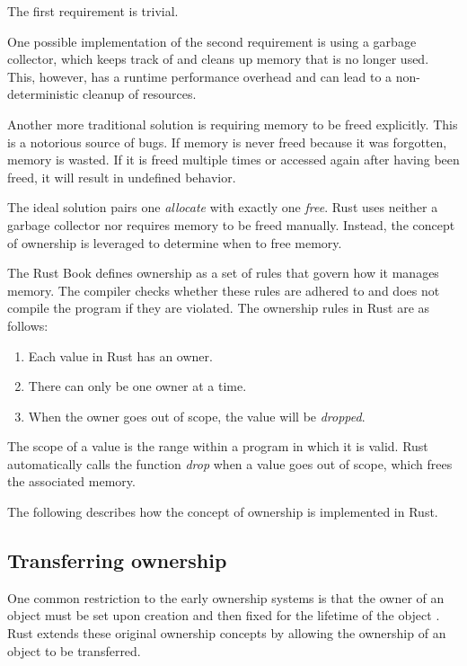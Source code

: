 \documentclass[sigplan,11pt,nonacm]{acmart}
\begin{document}
The first requirement is trivial.

One possible implementation of the second requirement is using a garbage collector, which keeps track of and cleans up memory that is no longer used.
This, however, has a runtime performance overhead and can lead to a non-deterministic cleanup of resources. \cite{understanding-evolving-rust}

Another more traditional solution is requiring memory to be freed explicitly.
This is a notorious source of bugs.
If memory is never freed because it was forgotten, memory is wasted.
If it is freed multiple times or accessed again after having been freed, it will result in undefined behavior.

The ideal solution pairs one \emph{allocate} with exactly one \emph{free}.
Rust uses neither a garbage collector nor requires memory to be freed manually.
Instead, the concept of ownership is leveraged to determine when to free memory.

The Rust Book \cite{rust-book} defines ownership as a set of rules that govern how it manages memory.
The compiler checks whether these rules are adhered to and does not compile the program if they are violated.
The ownership rules in Rust are as follows:
\begin{enumerate}
  \item Each value in Rust has an owner.
  \item There can only be one owner at a time.
  \item When the owner goes out of scope, the value will be \emph{dropped}.
\end{enumerate}
The scope of a value is the range within a program in which it is valid.
Rust automatically calls the function \emph{drop} when a value goes out of scope, which frees the associated memory.

The following describes how the concept of ownership is implemented in Rust.


\subsection{Transferring ownership}
\label{sec:rust-transferring-ownership}

One common restriction to the early ownership systems is that the owner of an object must be set upon creation and then fixed for the lifetime of the object \cite{ownership-types-survey}.
Rust extends these original ownership concepts by allowing the ownership of an object to be transferred.
\end{document}
